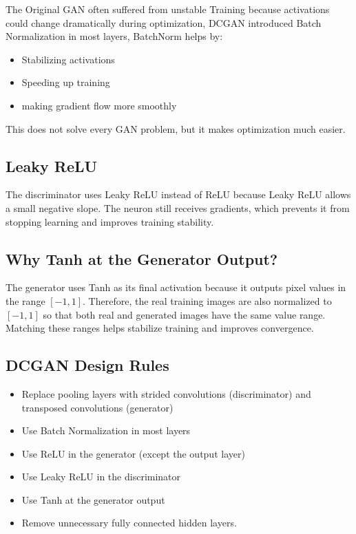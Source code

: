 The Original GAN often suffered from unstable Training because activations could change dramatically during optimization, DCGAN introduced Batch Normalization in most layers, BatchNorm helps by:
\begin{itemize}
    \item Stabilizing activations
    \item Speeding up training
    \item making gradient flow more smoothly
\end{itemize}

This does not solve every GAN problem, but it makes optimization much easier.

\subsection*{Leaky ReLU}

The discriminator uses Leaky ReLU instead of ReLU because Leaky ReLU allows a small negative slope. The neuron still receives gradients, which prevents it from stopping learning and improves training stability.

\subsection*{Why Tanh at the Generator Output?}

The generator uses Tanh as its final activation because it outputs pixel values in the range $[-1, 1]$. Therefore, the real training images are also normalized to $[-1, 1]$ so that both real and generated images have the same value range. Matching these ranges helps stabilize training and improves convergence.

\subsection*{DCGAN Design Rules}

\begin{itemize}
    \item Replace pooling layers with strided convolutions (discriminator) and transposed convolutions (generator)
    \item Use Batch Normalization in most layers
    \item Use ReLU in the generator (except the output layer)
    \item Use Leaky ReLU in the discriminator
    \item Use Tanh at the generator output
    \item Remove unnecessary fully connected hidden layers.
\end{itemize}


